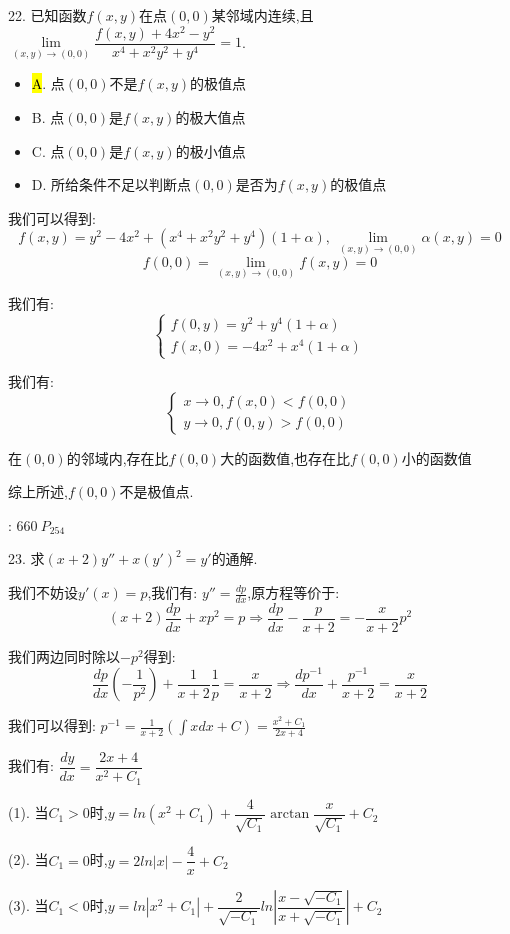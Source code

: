 22. 已知函数$f(x,y)$在点$(0,0)$某邻域内连续,且$\lim\limits_{(x,y)\rightarrow(0,0)}\dfrac{f(x,y)+4x^2-y^2}{x^4+x^2y^2+y^4}=1$.
\begin{itemize}
	\item \hl{A}. 点$(0,0)$不是$f(x,y)$的极值点
	\item B. 点$(0,0)$是$f(x,y)$的极大值点
	\item C. 点$(0,0)$是$f(x,y)$的极小值点
	\item D. 所给条件不足以判断点$(0,0)$是否为$f(x,y)$的极值点
\end{itemize}
\begin{solution}
	
	我们可以得到:  
	$$f(x,y)=y^2-4x^2+(x^4+x^2y^2+y^4)(1+\alpha),\ \lim\limits_{(x,y)\rightarrow(0,0)}\alpha(x,y)=0$$
	$$f(0,0)=\lim\limits_{(x,y)\rightarrow(0,0)}f(x,y)=0$$
	
	我们有:  $$\left\lbrace
	\begin{array}{l}
		f(0,y)=y^2+y^4(1+\alpha)\\
		f(x,0)=-4x^2+x^4(1+\alpha)
	\end{array}
	\right. $$
	
	我们有:  $$\left\lbrace
	\begin{array}{l}
		x\rightarrow 0, f(x,0)<f(0,0)\\
		y\rightarrow 0, f(0,y)>f(0,0)
	\end{array}
	\right. $$
	
	在$(0,0)$的邻域内,存在比$f(0,0)$大的函数值,也存在比$f(0,0)$小的函数值
	
	综上所述,$f(0,0)$不是极值点.
\end{solution}
\begin{anymark}[注]
	[题目来源]:  $660 \ P_{254}$
\end{anymark}

23. 求$(x+2)y''+x(y')^2=y'$的通解.
\begin{solution}
	
	我们不妨设$y'(x)=p$,我们有:  $y''=\frac{dp}{dx}$,原方程等价于:  
	$$(x+2)\frac{dp}{dx}+xp^2=p\Rightarrow \frac{dp}{dx}-\frac{p}{x+2}=-\dfrac{x}{x+2}p^2$$
	
	我们两边同时除以$-p^2$得到:  
	$$\frac{dp}{dx}(-\frac{1}{p^2})+\dfrac{1}{x+2}\frac{1}{p}=\frac{x}{x+2}\Rightarrow \frac{dp^{-1}}{dx}+\frac{p^{-1}}{x+2}=\frac{x}{x+2}$$
	
	我们可以得到:  $p^{-1}=\frac{1}{x+2}(\int xdx+C)=\frac{x^2+C_{1}}{2x+4}$
	
	我们有:  $\dfrac{dy}{dx}=\dfrac{2x+4}{x^2+C_{1}}$
	
	(1). 当$C_{1}>0$时,$y=ln(x^2+C_{1})+\dfrac{4}{\sqrt{C_{1}}}\arctan \dfrac{x}{\sqrt{C_{1}}}+C_{2}$
	
	(2). 当$C_{1}=0$时,$y=2ln|x|-\dfrac{4}{x}+C_{2}$
	
	(3). 当$C_{1}<0$时,$y=ln|x^2+C_{1}|+\dfrac{2}{\sqrt{-C_{1}}}ln|\dfrac{x-\sqrt{-C_{1}}}{x+\sqrt{-C_{1}}}|+C_{2}$
\end{solution}

